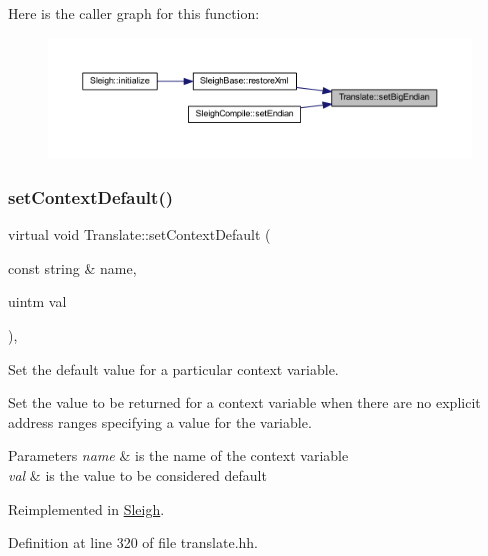 Here is the caller graph for this function\+:
\nopagebreak
\begin{figure}[H]
\begin{center}
\leavevmode
\includegraphics[width=350pt]{class_translate_a9a2ad5552b84744edd239c3854c8302a_icgraph}
\end{center}
\end{figure}
\mbox{\label{class_translate_ab608abbfb7f8a0ad21fed57dc00c0439}} 
\subsubsection{\texorpdfstring{setContextDefault()}{setContextDefault()}}
{\footnotesize\ttfamily virtual void Translate\+::set\+Context\+Default (\begin{DoxyParamCaption}\item[{const string \&}]{name,  }\item[{uintm}]{val }\end{DoxyParamCaption})\hspace{0.3cm}{\ttfamily [inline]}, {\ttfamily [virtual]}}



Set the default value for a particular context variable. 

Set the value to be returned for a context variable when there are no explicit address ranges specifying a value for the variable. 
\begin{DoxyParams}{Parameters}
{\em name} & is the name of the context variable \\
\hline
{\em val} & is the value to be considered default \\
\hline
\end{DoxyParams}


Reimplemented in \mbox{\hyperlink{class_sleigh_ac44342619fef0c42a0f65c415683e58e}{Sleigh}}.



Definition at line 320 of file translate.\+hh.


